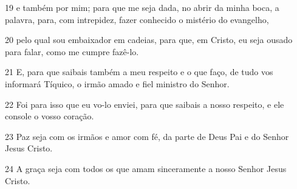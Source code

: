 \par 19 e também por mim; para que me seja dada, no abrir da minha boca, a palavra, para, com intrepidez, fazer conhecido o mistério do evangelho,
\par 20 pelo qual sou embaixador em cadeias, para que, em Cristo, eu seja ousado para falar, como me cumpre fazê-lo.
\par 21 E, para que saibais também a meu respeito e o que faço, de tudo vos informará Tíquico, o irmão amado e fiel ministro do Senhor.
\par 22 Foi para isso que eu vo-lo enviei, para que saibais a nosso respeito, e ele console o vosso coração.
\par 23 Paz seja com os irmãos e amor com fé, da parte de Deus Pai e do Senhor Jesus Cristo.
\par 24 A graça seja com todos os que amam sinceramente a nosso Senhor Jesus Cristo.


